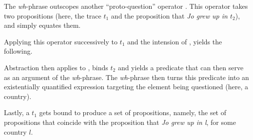 \begin{exe}
\end{exe}

The \textit{wh}-phrase outscopes another ``proto-question'' operator \parencite{Karttunen1977}. This operator takes two propositions (here, the trace $t_1$ and the proposition that \textit{Jo grew up in $t_2$}), and simply equates them. 

\begin{exe}
\end{exe}

Applying this operator successively to $t_1$ and the intension of , yields the following.

\begin{exe}
\end{exe}

Abstraction then applies to , binds $t_2$ and yields a predicate that can then serve as an argument of the \textit{wh}-phrase. The \textit{wh}-phrase then turns this predicate into an existentially quantified expression targeting the element being questioned (here, a country).

\begin{exe}
\end{exe}

Lastly, a $t_1$ gets bound to produce a set of propositions, namely, the set of propositions that coincide with the proposition that \textit{Jo grew up in l}, for some country $l$. 

\begin{exe}
\end{exe}

